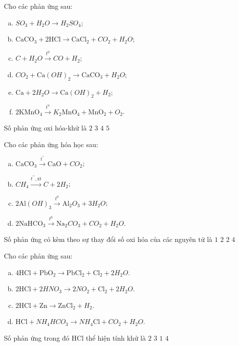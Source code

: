 \begin{ex}Cho các phản ứng sau:
	\begin{enumerate}[(a)]
		\item  $SO_3+H_2O\to H_2SO_4$;
		\item  $\mathrm{CaCO}_3+2\mathrm{HCl} \to \mathrm{CaCl}_2+CO_2+H_2O$;
		\item  $C+H_2O\xrightarrow{t^0} CO+H_2$;
		\item  $CO_2+\mathrm{Ca}(OH)_2\to \mathrm{CaCO}_3+H_2O$;
		\item  $\mathrm{Ca}+2H_2O\to \mathrm{Ca}(OH)_2+H_2$;
		\item  $2\mathrm{KMnO}_4\xrightarrow{t^n} K_2\mathrm{MnO}_4+\mathrm{MnO}_2+O_2$.
	\end{enumerate}
	Số phản ứng oxi hóa-khử là
	\choice
	{$2$}
	{\True $3$}
	{$4$}
	{$5$}
\end{ex}

\begin{ex}Cho các phản ứng hóa học sau:
	\begin{enumerate}[(a)]
		\item  $\mathrm{CaCO}_3\xrightarrow{t^{\text {"}}} \mathrm{CaO}+CO_2$;
		\item  $CH_4\xrightarrow{t^{\prime \prime}, \mathrm{xt}} C+2H_2$;
		\item  $2\mathrm{Al}(OH)_3\xrightarrow{t^0} \mathrm{Al}_2O_3+3H_2O$;
		\item  $2\mathrm{NaHCO}_3\xrightarrow{t^0} \mathrm{Na}_2CO_3+CO_2+H_2O$.
	\end{enumerate}
	Số phản ứng có kèm theo sự thay đổi số oxi hóa của các nguyên tử là
	\choice
	{\True $1$}
	{$2$}
	{$2$}
	{$4$}
\end{ex}

\begin{ex}[Đề TSĐH B-2009]
	Cho các phản ứng sau:
	\begin{enumerate}[(a)]
		\item  $4\mathrm{HCl}+\mathrm{PbO}_2\to \mathrm{PbCl}_2+\mathrm{Cl}_2+2H_2O$.
		\item  $2\mathrm{HCl}+2HNO_3\to 2NO_2+\mathrm{Cl}_2+2H_2O$.
		\item  $2\mathrm{HCl}+\mathrm{Zn} \to \mathrm{ZnCl}_2+H_2$.
		\item  $\mathrm{HCl}+NH_4HCO_3\to NH_4\mathrm{Cl}+CO_2+H_2O$.
	\end{enumerate}
	Số phản ứng trong đó $\mathrm{HCl}$ thể hiện tính khử là
	\choice
	{\True $2$}
	{$3$}
	{$1$}
	{$4$}
\end{ex}

